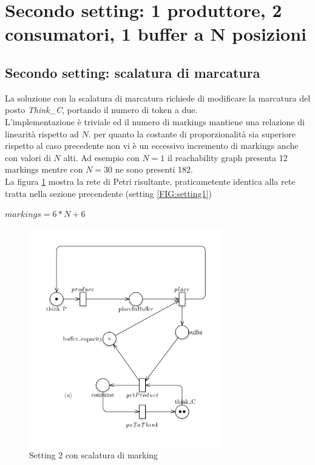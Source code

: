 \documentclass{article}
\begin{document}
\section{Secondo  setting: 1 produttore, 2 consumatori,  1 buffer a N posizioni}\label{SEC:secondo}
\subsection{Secondo  setting: scalatura di marcatura}\label{SEC:secondo-marking}
La soluzione con la scalatura di marcatura richiede di modificare la marcatura del posto \emph{Think\_C}, portando il numero di token a due.\\
L'implementazione è triviale ed il numero di markings mantiene una relazione di linearità rispetto ad $N$. per quanto la costante di proporzionalità sia superiore rispetto al caso precedente non vi è un eccessivo incremento di markings anche con valori di $N$ alti. Ad esempio con $N = 1$ il reachability graph presenta 12 markings mentre con $N = 30$ ne sono presenti 182.\\
La figura \ref{FIG:setting2_markdown} mostra la rete di Petri risultante, praticametente identica alla rete tratta nella sezione precendente (setting \ref{FIG:setting1})\\\begin{center}$markings = 6*N + 6$\end{center}
\begin{figure}[!h]
\centering
\includegraphics[width=0.75\textwidth]{./Esercizio2_img/setting2_markdown.png}
\caption{Setting 2 con scalatura di marking} \label{FIG:setting2_markdown}
\end{figure}
\end{document}
